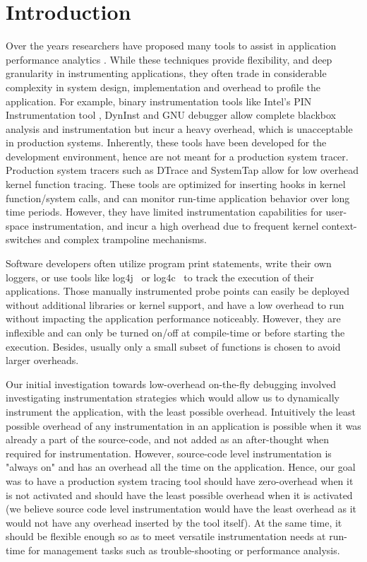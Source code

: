 \section{Introduction}
\label{sec:intro}


Over the years researchers have proposed many tools to assist in application performance analytics \cite{pin,gdb,dtrace,systemtap,lttng,utrace,ptrace,dyninst}.
While these techniques provide flexibility, and deep granularity in instrumenting applications, they often trade in considerable complexity in system design, implementation and overhead to profile the application. 
For example, binary instrumentation tools like Intel's PIN Instrumentation tool \cite{pin}, DynInst \cite{dyninst} and GNU debugger \cite{gdb} allow complete blackbox analysis and instrumentation but incur a heavy overhead, which is unacceptable in production systems. 
Inherently, these tools have been developed for the development environment, hence are not meant for a production system tracer.
Production system tracers such as DTrace\cite{dtrace} and SystemTap\cite{systemtap} allow for low overhead kernel function tracing.
These tools are optimized for inserting hooks in kernel function/system calls, and can monitor run-time application behavior over long time periods. 
However, they have limited instrumentation capabilities for user-space instrumentation, and incur a high overhead due to frequent kernel context-switches and complex trampoline mechanisms.

Software developers often utilize program print statements, write their own loggers, or use tools like log4j~\cite{log4j} or log4c~\cite{log4c} to track the execution of their applications.
Those manually instrumented probe points can easily be deployed without additional libraries or kernel support, and have a low overhead to run without impacting the application performance noticeably. 
However, they are inflexible and can only be turned on/off at compile-time or before starting the execution. 
Besides, usually only a small subset of functions is chosen to avoid larger overheads.

Our initial investigation towards low-overhead on-the-fly debugging involved investigating instrumentation strategies which would allow us to dynamically instrument the application, with the least possible overhead.
Intuitively the least possible overhead of any instrumentation in an application is possible when it was already a part of the source-code, and not added as an after-thought when required for instrumentation.
However, source-code level instrumentation is "always on" and has an overhead all the time on the application.
Hence, our goal was to have a production system tracing tool should have zero-overhead when it is not activated and should have the least possible overhead when it is activated (we believe source code level instrumentation would have the least overhead as it would not have any overhead inserted by the tool itself). 
At the same time, it should be flexible enough so as to meet versatile instrumentation needs at run-time for management tasks such as trouble-shooting or performance analysis.


